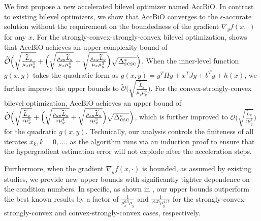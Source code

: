 \documentclass{osudissert96}
\begin{document}
 
 \vspace{0.2cm}
 We first propose a new accelerated bilevel optimizer named AccBiO. 
 In contrast to existing bilevel optimizers, we show that AccBiO converges to the $\epsilon$-accurate solution  without the requirement on the boundedness of the gradient {\small $\nabla_y f(x,\cdot)$} for any $x$. For the  strongly-convex-strongly-convex bilevel optimization,  shows that AccBiO achieves an upper complexity bound of {\footnotesize $\mathcal{\widetilde O}\Big(\sqrt{\frac{\widetilde L_y}{\mu_x\mu_y^{3}}}+\Big(\sqrt{\frac{ \rho_{yy}\widetilde L_y}{\mu_x\mu_y^{4}} }+ \sqrt{ \frac{\rho_{xy}\widetilde L_y}{\mu_x\mu_y^{3}}}\Big)\sqrt{\Delta^*_{\text{\normalfont\tiny SCSC}}}\Big)$}.  When the inner-level function $g(x,y)$ takes the quadratic form as {\footnotesize $g(x,y)=y^T H y +  x^T J y + b^Ty+h(x)$}, we further improve the upper bounds to {\footnotesize$ \mathcal{\widetilde O}\Big(\sqrt{\frac{\widetilde L_y}{\mu_x\mu_y^{3}}}\Big)$}. 
For the convex-strongly-convex bilevel optimization, AccBiO achieves an upper bound of {\footnotesize 
$\mathcal{\widetilde O}\Big( \sqrt{\frac{\widetilde L_y}{\epsilon\mu_y^3}}+\Big(\sqrt{\frac{\rho_{yy}\widetilde L_y}{\epsilon\mu_y^{4}}} +  \sqrt{\frac{\rho_{xy}\widetilde L_y}{\epsilon\mu_y^3}}\Big)\sqrt{\Delta^*_{\text{\normalfont\tiny CSC}}}\Big)$}, which is further improved to  {\footnotesize$\mathcal{\widetilde O}\Big(\sqrt{\frac{\widetilde L_y}{\epsilon\mu_y^3}}\Big)$} for the quadratic $g(x,y)$.
Technically, our analysis controls the finiteness of all iterates $x_k,k=0,....$ as the algorithm runs via an induction proof to ensure that the hypergradient estimation error will not explode after the acceleration steps. 
 
Furthermore, when the gradient $\nabla_y f(x,\cdot)$ is bounded, as assumed by existing studies, we provide new upper bounds with significantly tighter dependence on the condition numbers. In specific, as shown in , our upper bounds outperform the best known results by a factor of $\frac{1}{\mu_x^{0.5}\mu_y}$ and $\frac{1}{\epsilon^{0.25}\mu_y^{4.75}}$ for the strongly-convex-strongly-convex and  convex-strongly-convex 
cases, respectively. 
\end{document}
